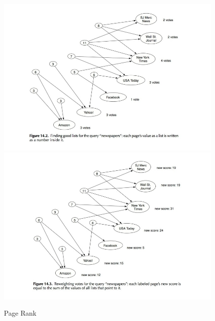 \begin{figure}
\centering
\includegraphics[scale=0.45]{images/ref/fig-14-2.jpeg}
\includegraphics[scale=0.45]{images/ref/fig-14-3.jpeg}
\caption{Page Rank}
\label{pageRankNews1}
\end{figure}

